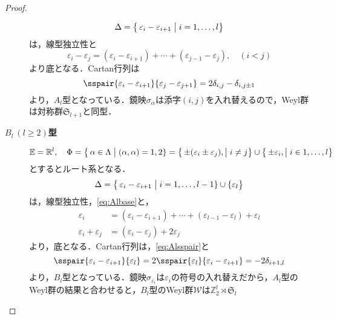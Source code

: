 \documentclass[rep_main]{subfiles}
\begin{document}
\begin{proof}
\begin{description}
		\begin{equation}
			\Delta = \bigl\{\, \varepsilon_i - \varepsilon_{i+1} \bigm| i = 1, \ldots, l\bigr\}
		\end{equation}	
		は，線型独立性と
		\begin{equation}
			 \label{eq:Albase}
			\varepsilon_i - \varepsilon_j = (\varepsilon_i - \varepsilon_{i+1}) + \cdots + (\varepsilon_{j-1} - \varepsilon_j),\quad  (i < j)
		\end{equation}
		より底となる．Cartan行列は
		\begin{equation}
			\label{eq:Alsspair}
			\sspair{\varepsilon_i - \varepsilon_{i+1}}{\varepsilon_j - \varepsilon_{j+1}} = 2\delta_{i,j} - \delta_{i,j\pm 1}
		\end{equation}
		より，$A_l$型となっている．鏡映$\sigma_\alpha$は添字$(i, j)$を入れ替えるので，Weyl群は対称群$\mathfrak{S}_{l+1}$と同型．
		
		\item[\textbf{$B_l\ (l \geq 2)$型}] 
		\begin{equation}
			\mathbb{E} = \mathbb{R}^l,\quad  \Phi = \bigl\{\, \alpha \in \Lambda \bigm| (\alpha, \alpha) = 1, 2\} = \bigl\{\, \pm(\varepsilon_i \pm \varepsilon_j), \bigm| i \neq j\bigr\} \cup \bigl\{\, \pm\varepsilon_i, \bigm| i \in 1, \ldots, l\bigr\}
		\end{equation}
		とするとルート系となる．
		\begin{equation}
			\Delta = \bigl\{\, \varepsilon_i - \varepsilon_{i+1} \bigm| i = 1, \ldots, l-1\} \cup \{\varepsilon_l\bigr\}
		\end{equation}	
		は，線型独立性，\eqref{eq:Albase}と，
		\begin{align}
			\varepsilon_i &= (\varepsilon_i - \varepsilon_{i+1}) + \cdots + (\varepsilon_{l-1} - \varepsilon_l) + \varepsilon_l \\
			\varepsilon_i + \varepsilon_j &= (\varepsilon_i - \varepsilon_j) + 2\varepsilon_j
		\end{align}
		より，底となる．Cartan行列は，\eqref{eq:Alsspair}と
		\begin{equation}
			\label{eq:Blsspair}
			\sspair{\varepsilon_i - \varepsilon_{i+1}}{\varepsilon_l} = 2\sspair{\varepsilon_l}{\varepsilon_i - \varepsilon_{i+1}} = -2\delta_{i+1,l}
		\end{equation}
		より，$B_l$型となっている．鏡映$\sigma_{\varepsilon_i}$は$\varepsilon_i$の符号の入れ替えだから，$A_l$型のWeyl群の結果と合わせると，$B_l$型のWeyl群$\mathscr{W}$は$\mathbb{Z}_2^l \rtimes \mathfrak{S}_l$
		

\end{description}
\end{proof}
\end{document}
